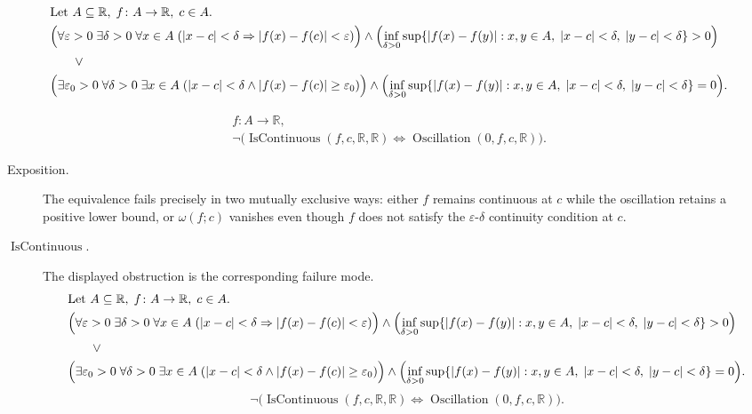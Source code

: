 \begin{remark*}
\[
\begin{aligned}
&\text{Let } A \subseteq \mathbb{R},\; f \colon A \to \mathbb{R},\; c \in A.\\
&\Bigl(\forall \varepsilon>0 \; \exists \delta>0 \; \forall x \in A \; (|x-c|<\delta \Rightarrow |f(x)-f(c)|<\varepsilon)\Bigr)
\land \Bigl(\inf_{\delta>0}\sup\{|f(x)-f(y)| : x,y \in A,\; |x-c|<\delta,\; |y-c|<\delta\}>0\Bigr)\\
&\qquad \lor\\
&\Bigl(\exists \varepsilon_0>0 \; \forall \delta>0 \; \exists x \in A \; (|x-c|<\delta \land |f(x)-f(c)| \ge \varepsilon_0)\Bigr)
\land \Bigl(\inf_{\delta>0}\sup\{|f(x)-f(y)| : x,y \in A,\; |x-c|<\delta,\; |y-c|<\delta\}=0\Bigr).
\end{aligned}
\]
\end{remark*}

\begin{remark*}
\[
\begin{aligned}
  f\colon A\to\mathbb{R},\\
\neg\bigl(\operatorname{IsContinuous}(f,c,\mathbb{R},\mathbb{R}) \Longleftrightarrow \operatorname{Oscillation}(0,f,c,\mathbb{R})\bigr).
\end{aligned}
\]
\end{remark*}

\begin{remark*}
\begin{description}
  \item[Exposition.]
The equivalence fails precisely in two mutually exclusive ways: either $f$ remains continuous at $c$ while the oscillation retains a positive lower bound, or $\omega(f;c)$ vanishes even though $f$ does not satisfy the $\varepsilon$-$\delta$ continuity condition at $c$.


  \item[\(\operatorname{IsContinuous}.\)]
  The displayed obstruction is the corresponding failure mode.
  \[
\begin{aligned}
&\text{Let } A \subseteq \mathbb{R},\; f \colon A \to \mathbb{R},\; c \in A.\\
&\Bigl(\forall \varepsilon>0 \; \exists \delta>0 \; \forall x \in A \; (|x-c|<\delta \Rightarrow |f(x)-f(c)|<\varepsilon)\Bigr)
\land \Bigl(\inf_{\delta>0}\sup\{|f(x)-f(y)| : x,y \in A,\; |x-c|<\delta,\; |y-c|<\delta\}>0\Bigr)\\
&\qquad \lor\\
&\Bigl(\exists \varepsilon_0>0 \; \forall \delta>0 \; \exists x \in A \; (|x-c|<\delta \land |f(x)-f(c)| \ge \varepsilon_0)\Bigr)
\land \Bigl(\inf_{\delta>0}\sup\{|f(x)-f(y)| : x,y \in A,\; |x-c|<\delta,\; |y-c|<\delta\}=0\Bigr).
\end{aligned}
  \]
  \[
\neg\bigl(\operatorname{IsContinuous}(f,c,\mathbb{R},\mathbb{R}) \Longleftrightarrow \operatorname{Oscillation}(0,f,c,\mathbb{R})\bigr).
  \]
\end{description}
\end{remark*}


